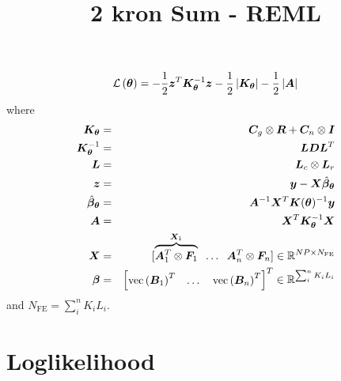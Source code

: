 \documentclass[10pt]{scrartcl}
\begin{document}
\renewcommand{\tablename}{Table}


\title{2 kron Sum - REML}

\maketitle

\begin{align}
\mathcal{L}\left(\bm{\theta}\right) =
-\frac{1}{2}\bm{z}^T\bm{K}_{\bm{\theta}}^{-1}\bm{z}
-\frac{1}{2}\left|\bm{K}_{\bm{\theta}}\right|-\frac{1}{2}\left|\bm{A}\right|
\end{align}
where
\begin{eqnarray}
\bm{K}_{\bm{\theta}} & = & \bm{C}_g\otimes\bm{R}+\bm{C}_n\otimes\bm{I} \\
\bm{K}_{\bm{\theta}}^{-1} & = & \bm{LDL}^T \\
\bm{L} & = & \bm{L}_c\otimes\bm{L}_r \\
\bm{z} & = & \bm{y}-\bm{X}\hat{\bm{\beta}}_{\bm{\theta}} \\
\hat{\bm{\beta}}_{\bm{\theta}} & = & \bm{A}^{-1}\bm{X}^T\bm{K}(\bm{\theta})^{-1}\bm{y} \\
\bm{A} & = & \bm{X}^T\bm{K}_{\bm{\theta}}^{-1}\bm{X} \\
\bm{X} & = & 
[
\overbrace{
\bm{A}_1^T\otimes\bm{F}_1}^{\bm{X}_1}
\;\; \dots \;\; \bm{A}_n^T\otimes\bm{F}_n
]
\in\mathbb{R}^{NP\times N_{\text{FE}}} \\
\bm{\beta} & = &
\begin{bmatrix}
\mathrm{vec}\left(\bm{B}_1\right)^T & \dots & \mathrm{vec}\left(\bm{B}_n\right)^T
\end{bmatrix}
^T
\in\mathbb{R}^{\sum_i^nK_iL_i}
\end{eqnarray}
and
$N_{\text{FE}}=\sum_i^nK_iL_i$.

\section{Loglikelihood}
\end{document}
